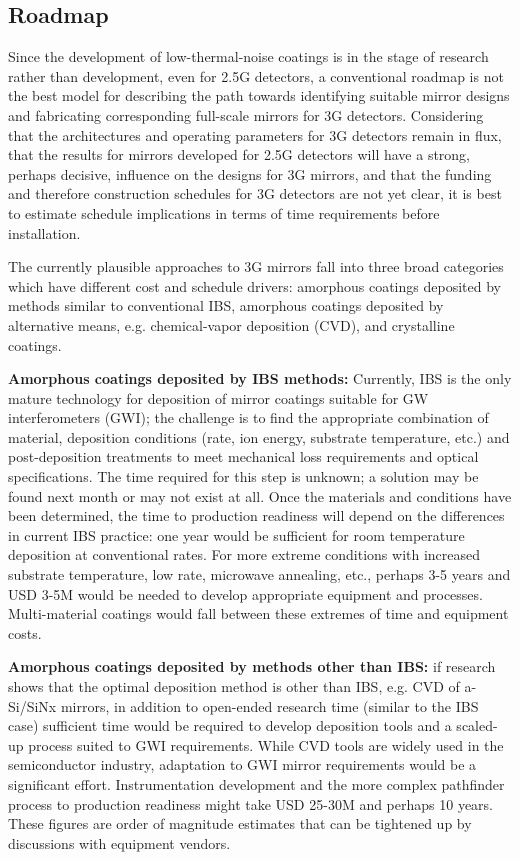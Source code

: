 \subsection{Roadmap}
Since the development of low-thermal-noise coatings is in the stage of research rather than development, even for 2.5G detectors, a conventional roadmap is not the best model for describing the path towards identifying suitable mirror designs and fabricating corresponding full-scale mirrors for 3G detectors. Considering that the architectures and operating parameters for 3G detectors remain in flux, that the results for mirrors developed for 2.5G detectors will have a strong, perhaps decisive, influence on the designs for 3G mirrors, and that the funding and therefore construction schedules for 3G detectors are not yet clear, it is best to estimate schedule implications in terms of time requirements before installation. 

The currently plausible approaches to 3G mirrors fall into three broad categories which have different cost and schedule drivers: amorphous coatings deposited by methods similar to conventional IBS, amorphous coatings deposited by alternative means, e.g. chemical-vapor deposition (CVD), and crystalline coatings. 

\textbf{Amorphous coatings deposited by IBS methods:} 
Currently, IBS is the only mature technology for deposition of mirror coatings suitable for GW interferometers (GWI); the challenge is to find the appropriate combination of material, deposition conditions (rate, ion energy, substrate temperature, etc.) and post-deposition treatments to meet mechanical loss requirements and optical specifications. The time required for this step is unknown; a solution may be found next month or may not exist at all. Once the materials and conditions have been determined, the time to production readiness will depend on the differences in current IBS practice: one year would be sufficient for room temperature deposition at conventional rates. For more extreme conditions with increased substrate temperature, low rate, microwave annealing, etc., perhaps 3-5 years and USD 3-5M would be needed to develop appropriate equipment and processes. Multi-material coatings would fall between these extremes of time and equipment costs. 

\textbf{Amorphous coatings deposited by methods other than IBS:} 
if research shows that the optimal deposition method is other than IBS, e.g. CVD of a-Si/SiNx mirrors, in addition to open-ended research time (similar to the IBS case) sufficient time would be required to develop deposition tools and a scaled-up process suited to GWI requirements. While CVD tools are widely used in the semiconductor industry, adaptation to GWI mirror requirements would be a significant effort. Instrumentation development and the more complex pathfinder process to production readiness might take USD 25-30M and perhaps 10 years. These figures are order of magnitude estimates that can be tightened up by discussions with equipment vendors. 

